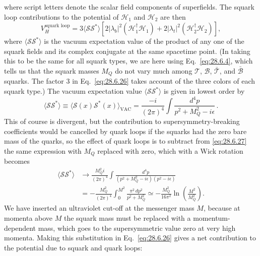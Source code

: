 where script letters denote the scalar field components of superfields.
The squark loop contributions to the potential of \(\mathcal{H}_1\) and
\(\mathcal{H}_2\) are then
\begin{equation}
  V_H^{\text{squark loop}}
  =3\langle\mathcal{S}\mathcal{S}^*\rangle
  \left[
    2\lvert\lambda_b\rvert^2(\mathcal{H}_1^\dagger\mathcal{H}_1)
    +2\lvert\lambda_t\rvert^2(\mathcal{H}_2^\dagger\mathcal{H}_2)
  \right],
  \tag{28.6.26}\label{eq:28.6.26}
\end{equation}
where \(\langle\mathcal{S}\mathcal{S}^*\rangle\) is the vacuum expectation
value of the product of any one of the squark fields and its complex
conjugate at the same spacetime point. (In taking this to be the same for
all squark types, we are here using Eq.~\eqref{eq:28.6.4}, which tells us
that the squark masses \(M_Q\) do not vary much among
\(\mathcal{T}\), \(\mathcal{B}\), \(\bar{\mathcal{T}}\), and
\(\bar{\mathcal{B}}\) squarks. The factor 3 in Eq.~\eqref{eq:28.6.26}
takes account of the three colors of each squark type.) The vacuum
expectation value \(\langle\mathcal{S}\mathcal{S}^*\rangle\) is given in
lowest order by
\begin{equation}
  \langle\mathcal{S}\mathcal{S}^*\rangle
  \equiv
  \langle\mathcal{S}(x)\mathcal{S}^*(x)\rangle_{\mathrm{VAC}}
  =\frac{-i}{(2\pi)^4}\int
    \frac{d^4p}{p^2+M_Q^2-i\epsilon}\,.
  \tag{28.6.27}\label{eq:28.6.27}
\end{equation}
This of course is divergent, but the contribution to supersymmetry-breaking
coefficients would be cancelled by quark loops if the squarks had the zero
bare mass of the quarks, so the effect of quark loops is to subtract from
\eqref{eq:28.6.27} the same expression with \(M_Q\) replaced with zero,
which with a Wick rotation becomes
\[
  \begin{aligned}
    \langle\mathcal{S}\mathcal{S}^*\rangle
    &\longrightarrow
    \frac{M_Q^2i}{(2\pi)^4}\int
      \frac{d^4p}
      {(p^2+M_Q^2-i\epsilon)(p^2-i\epsilon)}\\
    &=-\frac{M_Q^2}{(2\pi)^4}\int_0^{M^2}
      \frac{\pi^2\,dp^2}{p^2+M_Q^2}
    \simeq-\frac{M_Q^2}{16\pi^2}
      \ln\left(\frac{M^2}{M_Q^2}\right).
  \end{aligned}
\]
We have inserted an ultraviolet cut-off at the messenger mass \(M\),
because at momenta above \(M\) the squark mass must be replaced with a
momentum-dependent mass, which goes to the supersymmetric value zero at
very high momenta. Making this substitution in Eq.~\eqref{eq:28.6.26}
gives a net contribution to the potential due to squark and quark loops:
